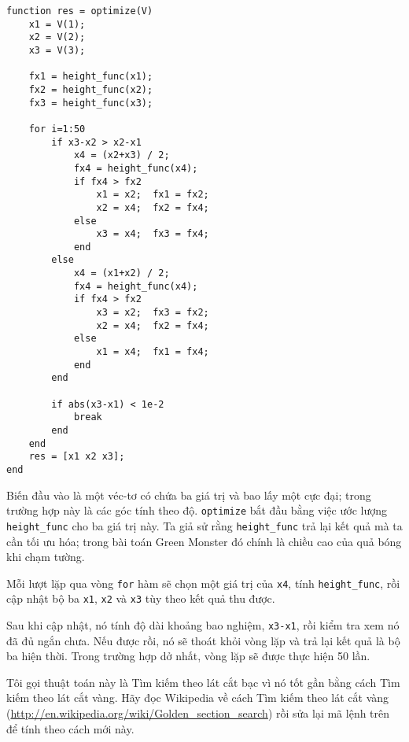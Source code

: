 \documentclass[12pt]{book}
\begin{document}
\begin{verbatim}
function res = optimize(V)
    x1 = V(1);
    x2 = V(2);
    x3 = V(3);
    
    fx1 = height_func(x1);
    fx2 = height_func(x2);
    fx3 = height_func(x3);
   
    for i=1:50
        if x3-x2 > x2-x1
            x4 = (x2+x3) / 2;
            fx4 = height_func(x4);
            if fx4 > fx2
                x1 = x2;  fx1 = fx2;
                x2 = x4;  fx2 = fx4;
            else
                x3 = x4;  fx3 = fx4;
            end
        else
            x4 = (x1+x2) / 2;
            fx4 = height_func(x4);
            if fx4 > fx2
                x3 = x2;  fx3 = fx2;
                x2 = x4;  fx2 = fx4;
            else
                x1 = x4;  fx1 = fx4;
            end
        end

        if abs(x3-x1) < 1e-2
            break
        end
    end
    res = [x1 x2 x3];
end
\end{verbatim}
%
Biến đầu vào là một véc-tơ có chứa ba giá trị và bao lấy một cực đại;
trong trường hợp này là các góc tính theo độ. {\tt optimize} bắt đầu 
bằng việc ước lượng \verb#height_func# cho ba giá trị này.
Ta giả sử rằng \verb#height_func# trả lại kết quả mà ta cần 
tối ưu hóa; trong bài toán Green Monster đó chính là chiều cao của 
quả bóng khi chạm tường.

Mỗi lượt lặp qua vòng {\tt for} hàm sẽ chọn một giá trị của {\tt x4}, 
tính  \verb#height_func#, rồi cập nhật bộ ba {\tt x1}, {\tt x2} và 
{\tt x3} tùy theo kết quả thu được.

Sau khi cập nhật, nó tính độ dài khoảng bao nghiệm, {\tt x3-x1},
rồi kiểm tra xem nó đã đủ ngắn chưa. Nếu được rồi, nó sẽ thoát khỏi 
vòng lặp và trả lại kết quả là bộ ba hiện thời. Trong trường hợp dở nhất, 
vòng lặp sẽ được thực hiện 50 lần.

\begin{ex}
Tôi gọi thuật toán này là Tìm kiếm theo lát cắt bạc vì nó tốt gần bằng 
cách Tìm kiếm theo lát cắt vàng. Hãy đọc Wikipedia về cách Tìm 
kiếm theo lát cắt vàng 
(\url{http://en.wikipedia.org/wiki/Golden_section_search}) rồi sửa lại 
mã lệnh trên để tính theo cách mới này.
\end{ex}
\end{document}
